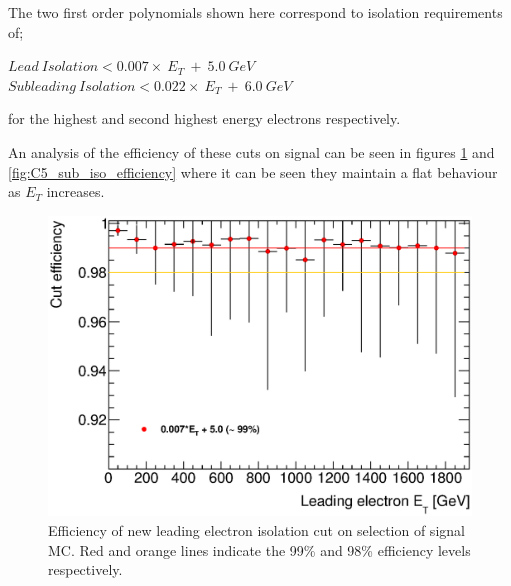 The two first order polynomials shown here correspond to isolation requirements of;
   \begin{center}
   $Lead~Isolation < 0.007\times~E_{T}~+~5.0~GeV$\\
   $Subleading~Isolation < 0.022\times~E_{T}~+~6.0~GeV$\\
   \end{center}
for the highest and second highest energy electrons respectively. 

An analysis of the efficiency of these cuts on signal can be seen in figures \ref{fig:C5_lead_iso_efficiency} and \ref{fig:C5_sub_iso_efficiency} where it can be seen they maintain a flat behaviour as $E_{T}$ increases.


   \begin{figure}[h]
      \begin{center}
      \includegraphics[scale=0.6]{images/C5_lead_iso_efficiency.eps}
      \end{center}
   \caption{Efficiency of new leading electron isolation cut on selection of signal MC. Red and orange lines indicate the 99\% and 98\% efficiency levels respectively.}
   \label{fig:C5_lead_iso_efficiency}
   \end{figure}

